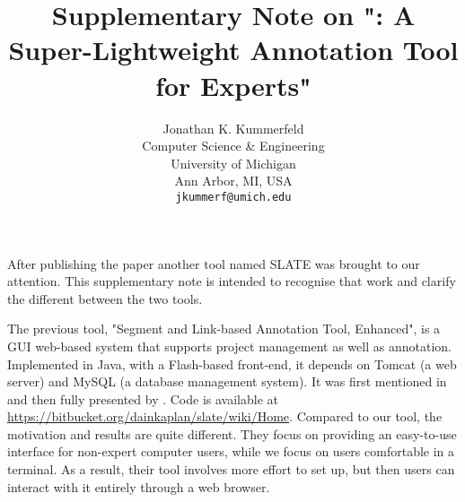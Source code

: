 \documentclass[11pt,a4paper]{article}
\title{Supplementary Note on "\slate: A Super-Lightweight Annotation Tool for Experts"}
\author{
  Jonathan K. Kummerfeld \\
  Computer Science \& Engineering \\
  University of Michigan \\
  Ann Arbor, MI, USA \\
  {\tt jkummerf@umich.edu}
}
\date{}
\begin{document}
\maketitle

After publishing the paper another tool named SLATE was brought to our attention.
This supplementary note is intended to recognise that work and clarify the different between the two tools.

The previous tool, "Segment and Link-based Annotation Tool, Enhanced", is a GUI web-based system that supports project management as well as annotation.
Implemented in Java, with a Flash-based front-end, it depends on Tomcat (a web server) and MySQL (a database management system).
It was first mentioned in \citet{prior-slate0} and then fully presented by \citet{prior-slate1}.
Code is available at \url{https://bitbucket.org/dainkaplan/slate/wiki/Home}.
Compared to our tool, the motivation and results are quite different.
They focus on providing an easy-to-use interface for non-expert computer users, while we focus on users comfortable in a terminal.
As a result, their tool involves more effort to set up, but then users can interact with it entirely through a web browser.



\end{document}
